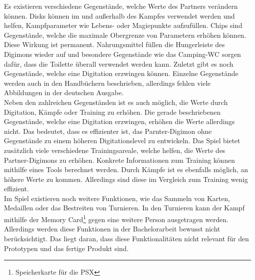 Es existieren verschiedene Gegenstände, welche Werte des Partners verändern können.
Disks können im und außerhalb des Kampfes verwendet werden und helfen, Kampfparameter wie Lebens- oder Magiepunkte aufzufüllen.
Chips sind Gegenstände, welche die maximale Obergrenze von Parametern erhöhen können.
Diese Wirkung ist permanent.
Nahrungsmittel füllen die Hungerleiste des Digimons wieder auf und besondere Gegenstände wie das Camping-WC sorgen dafür, dass die Toilette überall verwendet werden kann.
Zuletzt gibt es noch Gegenstände, welche eine Digitation erzwingen können.
Einzelne Gegenstände werden auch in den Handbüchern beschrieben, allerdings fehlen viele Abbildungen in der deutschen Ausgabe.\\

Neben den zahlreichen Gegenständen ist es auch möglich, die Werte durch Digitation, Kämpfe oder Training zu erhöhen.
Die gerade beschriebenen Gegenstände, welche eine Digitation erzwingen, erhöhen die Werte allerdings nicht.
Das bedeutet, dass es effizienter ist, das Parnter-Digimon ohne Gegenstände zu einem höheren Digitationslevel zu entwickeln.
Das Spiel bietet zusätzlich viele verschiedene Trainingsareale, welche helfen, die Werte des Partner-Digimons zu erhöhen.
Konkrete Informationen zum Training können mithilfe eines Tools berechnet werden\cite{dw-training}.
Durch Kämpfe ist es ebenfalls möglich, an höhere Werte zu kommen.
Allerdings sind diese im Vergleich zum Training wenig effizient.\\

Im Spiel existieren noch weitere Funktionen, wie das Sammeln von Karten, Medaillen oder das Bestreiten von Turnieren.
In den Turnieren kann der Kampf mithilfe der Memory Card\footnote{Speicherkarte für die \ac{PSX}} gegen eine weitere Person ausgetragen werden.
Allerdings werden diese Funktionen in der Bachelorarbeit bewusst nicht berücksichtigt.
Das liegt daran, dass diese Funktionalitäten nicht relevant für den Prototypen und das fertige Produkt sind.\\